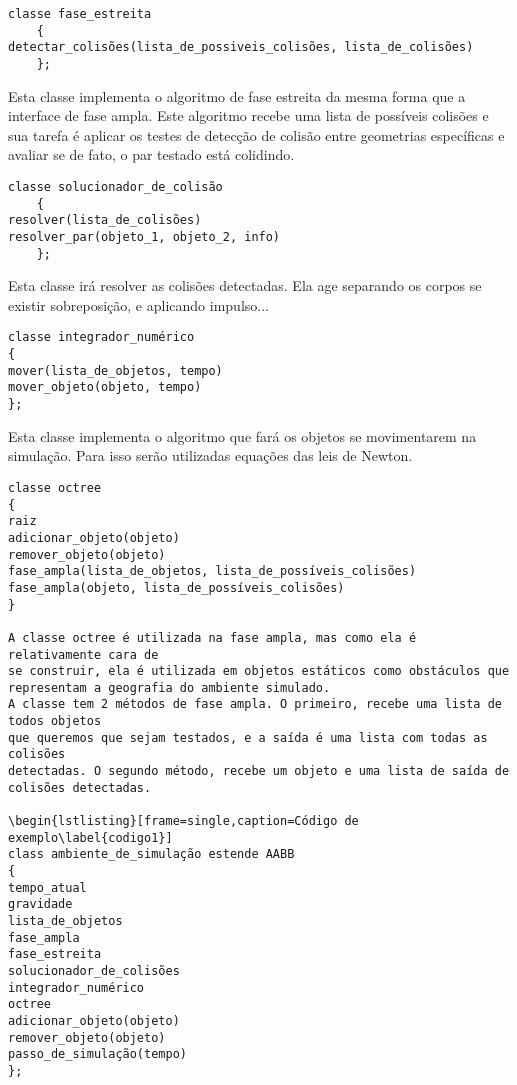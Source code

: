 \begin{lstlisting}[frame=single,caption=Código de exemplo\label{codigo1}]
classe fase_estreita
    {
detectar_colisões(lista_de_possiveis_colisões, lista_de_colisões)
    };
\end{lstlisting}

Esta classe implementa o algoritmo de fase estreita da mesma forma que a interface
de fase ampla. Este algoritmo recebe uma lista de possíveis colisões e sua
tarefa é aplicar os testes de detecção de colisão entre geometrias específicas
e avaliar se de fato, o par testado está colidindo.

\begin{lstlisting}[frame=single,caption=Código de exemplo\label{codigo1}]
classe solucionador_de_colisão
    {
resolver(lista_de_colisões)
resolver_par(objeto_1, objeto_2, info)
    };
\end{lstlisting}

Esta classe irá resolver as colisões detectadas. Ela age separando os corpos se
existir sobreposição, e aplicando impulso...

\begin{lstlisting}[frame=single,caption=Código de exemplo\label{codigo1}]
classe integrador_numérico
{
mover(lista_de_objetos, tempo)
mover_objeto(objeto, tempo)
};
\end{lstlisting}

 Esta classe implementa o algoritmo que fará os objetos se movimentarem na simulação. Para isso serão utilizadas equações das leis de Newton.

\begin{lstlisting}[frame=single,caption=Código de exemplo\label{codigo1}]
classe octree
{
raiz
adicionar_objeto(objeto)
remover_objeto(objeto)
fase_ampla(lista_de_objetos, lista_de_possíveis_colisões)
fase_ampla(objeto, lista_de_possíveis_colisões)
}

A classe octree é utilizada na fase ampla, mas como ela é relativamente cara de
se construir, ela é utilizada em objetos estáticos como obstáculos que representam a geografia do ambiente simulado.
A classe tem 2 métodos de fase ampla. O primeiro, recebe uma lista de todos objetos
que queremos que sejam testados, e a saída é uma lista com todas as colisões
detectadas. O segundo método, recebe um objeto e uma lista de saída de colisões detectadas.

\begin{lstlisting}[frame=single,caption=Código de exemplo\label{codigo1}]
class ambiente_de_simulação estende AABB
{
tempo_atual
gravidade
lista_de_objetos
fase_ampla
fase_estreita
solucionador_de_colisões
integrador_numérico
octree
adicionar_objeto(objeto)
remover_objeto(objeto)
passo_de_simulação(tempo)
};
\end{lstlisting}


